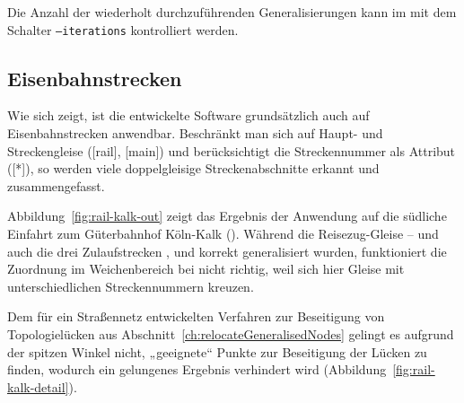 \documentclass[../main/thesis.tex]{subfiles}
\begin{document}

Die Anzahl der wiederholt durchzuführenden Generalisierungen kann im  mit dem Schalter \texttt{--iterations} kontrolliert werden.




\subsection{Eisenbahnstrecken}
\label{ch:result-railways}

Wie sich zeigt, ist die entwickelte Software grundsätzlich auch auf Eisenbahnstrecken anwendbar.
Beschränkt man sich auf Haupt- und Streckengleise ([rail], [main]) und berücksichtigt die Streckennummer als Attribut ([*]), so werden viele doppelgleisige Streckenabschnitte erkannt und zusammengefasst.

Abbildung~\ref{fig:rail-kalk-out} zeigt das Ergebnis der Anwendung auf die südliche Einfahrt zum Güterbahnhof Köln-Kalk ().
Während die Reisezug-Gleise -- und auch die drei Zulaufstrecken ,  und  korrekt generalisiert wurden, funktioniert die Zuordnung im Weichenbereich bei  nicht richtig, weil sich hier Gleise mit unterschiedlichen Streckennummern kreuzen.

Dem für ein Straßennetz entwickelten Verfahren zur Beseitigung von Topologielücken aus Abschnitt~\ref{ch:relocateGeneralisedNodes} gelingt es aufgrund der spitzen Winkel nicht, „geeignete“ Punkte zur Beseitigung der Lücken zu finden, wodurch ein gelungenes Ergebnis verhindert wird (Abbildung~\ref{fig:rail-kalk-detail}).
\end{document}

